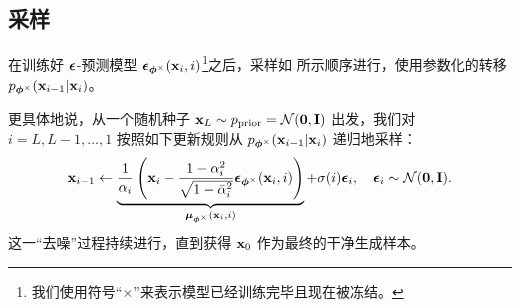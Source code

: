 




\subsection{采样}
在训练好 ${\bm{\epsilon}}$-预测模型 $\bm{\epsilon}_{\bm{\phi}^\times}({\mathbf{x}}_i, i)$\footnote{我们使用符号“$\times$”来表示模型已经训练完毕且现在被冻结。}之后，采样如  所示顺序进行，使用参数化的转移 $p_{\bm{\phi}^\times}({\mathbf{x}}_{i-1} | {\mathbf{x}}_i)$。


更具体地说，从一个随机种子 ${\mathbf{x}}_L \sim p_{\text{prior}} = \mathcal{N}(\bm{0},{\mathbf{I}})$ 出发，我们对 $i = L, L-1, \dots, 1$ 按照如下更新规则从 $p_{\bm{\phi}^\times}({\mathbf{x}}_{i-1} | {\mathbf{x}}_i)$ 递归地采样：
\begin{align}\label{eq:ddpm-sampling}
    {\mathbf{x}}_{i-1} \leftarrow \underbrace{\frac{1}{\alpha_i}\left( {\mathbf{x}}_i  - \frac{1-\alpha_i^2}{\sqrt{1-\bar{\alpha}_i^2}} \bm{\epsilon}_{\bm{\phi}^\times}({\mathbf{x}}_i, i)\right)}_{\bm{\mu}_{\bm{\phi}^\times}({\mathbf{x}}_i, i)} +\sigma(i) \bm{\epsilon}_i,\quad \bm{\epsilon}_i\sim  \mathcal{N}(\bm{0},{\mathbf{I}}).
\end{align}
这一“去噪”过程持续进行，直到获得 ${\mathbf{x}}_0$ 作为最终的干净生成样本。 




